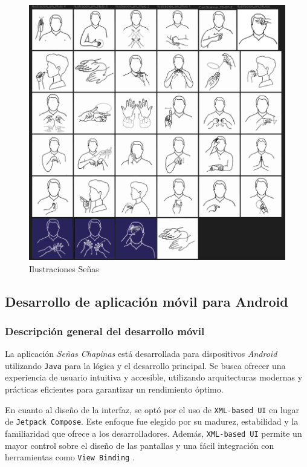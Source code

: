 \begin{figure} [H]
    \centering
    \includegraphics[width=1\linewidth]{figuras/senas.png}
    \caption{Ilustraciones Señas}
    \label{fig:enter-label}
\end{figure}


\subsection{Desarrollo de aplicación móvil para Android}

\subsubsection{Descripción general del desarrollo móvil}

La aplicación \textit{Señas Chapinas} está desarrollada para dispositivos \textit{Android} utilizando \texttt{Java} para la lógica y el desarrollo principal. Se busca ofrecer una experiencia de usuario intuitiva y accesible, utilizando arquitecturas modernas y prácticas eficientes para garantizar un rendimiento óptimo.

En cuanto al diseño de la interfaz, se optó por el uso de \texttt{XML-based UI} en lugar de \texttt{Jetpack Compose}. Este enfoque fue elegido por su madurez, estabilidad y la familiaridad que ofrece a los desarrolladores. Además, \texttt{XML-based UI} permite un mayor control sobre el diseño de las pantallas y una fácil integración con herramientas como \texttt{View Binding} \cite{DeLaGrana2024}.

